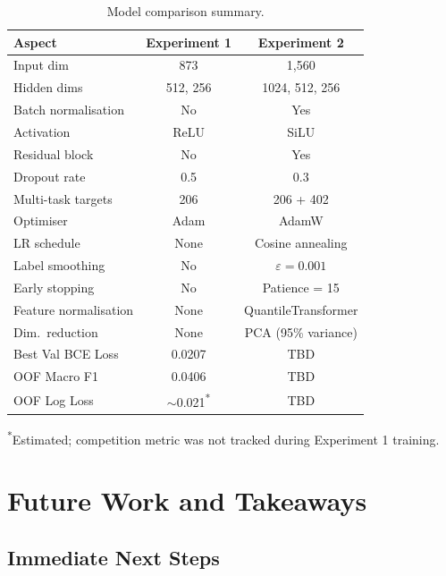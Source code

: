 \documentclass[12pt, a4paper]{article}
\begin{document}
\begin{table}[h!]
\centering
\caption{Model comparison summary.}
\label{tab:comparison}
\begin{tabular}{lcc}
\toprule
\textbf{Aspect} & \textbf{Experiment 1} & \textbf{Experiment 2} \\
\midrule
Input dim           & 873         & 1,560 \\
Hidden dims         & 512, 256    & 1024, 512, 256 \\
Batch normalisation & No          & Yes \\
Activation          & ReLU        & SiLU \\
Residual block      & No          & Yes \\
Dropout rate        & 0.5         & 0.3 \\
Multi-task targets  & 206         & 206 + 402 \\
Optimiser           & Adam        & AdamW \\
LR schedule         & None        & Cosine annealing \\
Label smoothing     & No          & $\varepsilon = 0.001$ \\
Early stopping      & No          & Patience = 15 \\
Feature normalisation & None      & QuantileTransformer \\
Dim.\ reduction     & None        & PCA (95\% variance) \\
\midrule
Best Val BCE Loss   & 0.0207      & TBD \\
OOF Macro F1        & 0.0406      & TBD \\
OOF Log Loss        & $\sim$0.021\textsuperscript{*} & TBD \\
\bottomrule
\end{tabular}
\vspace{0.3em}
{\small \textsuperscript{*}Estimated; competition metric was not tracked during Experiment 1 training.}
\end{table}

\section{Future Work and Takeaways}

\subsection{Immediate Next Steps}
\end{document}
